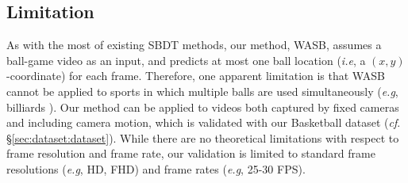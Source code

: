 \documentclass{bmvc2k}
\def\eg{\emph{e.g}\bmvaOneDot}
\def\ie{\emph{i.e}\bmvaOneDot}
\begin{document}
\subsection{Limitation}
\label{sec:eval:limitation}
As with the most of existing SBDT methods, our method, WASB, assumes a ball-game video as an input, and predicts at most one ball location (\ie, a $(x,y)$-coordinate) for each frame.
Therefore, one apparent limitation is that WASB cannot be applied to sports in which multiple balls are used simultaneously
(\eg, billiards \cite{rea+2004ivr}).
Our method can be applied to videos both captured by fixed cameras and including camera motion, which is validated with our Basketball dataset ({\it cf}. \S \ref{sec:dataset:dataset}).
While there are no theoretical limitations with respect to frame resolution and frame rate, our validation is limited to standard frame resolutions (\eg, HD, FHD) and frame rates (\eg, 25-30 FPS).
\end{document}
